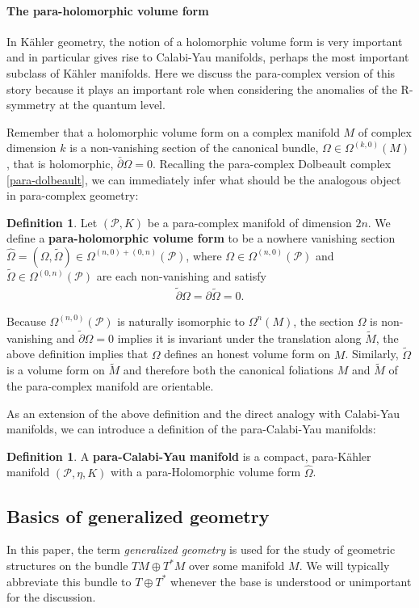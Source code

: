 \documentclass{article}
\newcommand{\TT}{{T\oplus T^*}}
\newcommand{\PS}{\mathcal{P}}
\newcommand{\p}{\partial}
\newcommand{\pt}{\tilde{\partial}}
\newcommand{\Mt}{\tl{M}}
\def\tl{\tilde}
\theoremstyle{definition}
\newtheorem{Def}[theorem]{Definition}
\theoremstyle{remark}
\begin{document}
\paragraph{The para-holomorphic volume form}
In K\"ahler geometry, the notion of a holomorphic volume form is very important and in particular gives rise to Calabi-Yau manifolds, perhaps the most important subclass of K\"ahler manifolds. Here we discuss the para-complex version of this story because it plays an important role when considering the anomalies of the R-symmetry at the quantum level.

Remember that a holomorphic volume form on a complex manifold $M$ of complex dimension $k$ is a non-vanishing section of the canonical bundle, $\Omega \in \Omega^{(k,0)}(M)$, that is holomorphic, $\bar{\p}\Omega=0$. Recalling the para-complex Dolbeault complex \eqref{para-dolbeault}, we can immediately infer what should be the analogous object in para-complex geometry:
\begin{Def}
Let $(\PS,K)$ be a para-complex manifold of dimension $2n$. We define a {\bf para-holomorphic volume form} to be a nowhere vanishing section $\hat{\Omega}=(\Omega,\tl{\Omega})\in \Omega^{(n,0)+(0,n)}(\PS)$, where $\Omega \in \Omega^{(n,0)}(\PS)$ and $\tl{\Omega}\in \Omega^{(0,n)}(\PS)$ are each non-vanishing and satisfy
\begin{align*}
\pt \Omega=\p \tl{\Omega}=0.
\end{align*}
\end{Def}
Because $\Omega^{(n,0)}(\PS)$ is naturally isomorphic to $\Omega^n(M)$, the section $\Omega$ is non-vanishing and $\pt \Omega=0$ implies it is invariant under the translation along $\Mt$, the above definition implies that $\Omega$ defines an honest volume form on $M$. Similarly, $\tl{\Omega}$ is a volume form on $\Mt$ and therefore both the canonical foliations $M$ and $\Mt$ of the para-complex manifold are orientable.

As an extension of the above definition and the direct analogy with Calabi-Yau manifolds, we can introduce a definition of the para-Calabi-Yau manifolds:
\begin{Def}
A {\bf para-Calabi-Yau manifold} is a compact, para-K\"ahler manifold $(\PS,\eta,K)$ with a para-Holomorphic volume form $\hat{\Omega}$.
\end{Def}

\subsection{Basics of generalized geometry}
In this paper, the term {\it generalized geometry} is used for the study of geometric structures on the bundle $TM \oplus T^*M$ over some manifold $M$. We will typically abbreviate this bundle to $\TT$ whenever the base is understood or unimportant for the discussion.
\end{document}
